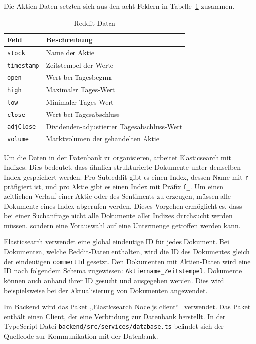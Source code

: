 \documentclass[a4paper, 10pt, conference]{IEEEtran}
\begin{document}
Die Aktien-Daten setzten sich aus den acht Feldern in Tabelle~\ref{tab:stock} zusammen.

\begin{table}[h!]
\begin{center}
\caption{Reddit-Daten}
\label{tab:stock}
\begin{tabular}{|l|l|}
\textbf{Feld} & \textbf{Beschreibung}\\
\hline
\texttt{stock}		& Name der Aktie\\
\texttt{timestamp}	& Zeitstempel der Werte\\
\texttt{open}		& Wert bei Tagesbeginn\\
\texttt{high}		& Maximaler Tages-Wert\\
\texttt{low}		& Minimaler Tages-Wert\\
\texttt{close}		& Wert bei Tagesabschluss\\
\texttt{adjClose}	& Dividenden-adjustierter Tagesabschluss-Wert\\
\texttt{volume}		& Marktvolumen der gehandelten Aktie\\
\end{tabular}
\end{center}
\end{table}

Um die Daten in der Datenbank zu organisieren, arbeitet Elasticsearch mit Indizes. Dies bedeutet, dass ähnlich strukturierte  Dokumente unter demselben Index gespeichert werden. Pro Subreddit gibt es einen Index, dessen Name mit \texttt{r\_} präfigiert ist, und pro Aktie gibt es einen Index mit Präfix \texttt{f\_}. Um einen zeitlichen Verlauf einer Aktie oder des Sentiments zu erzeugen, müssen alle Dokumente eines Index abgerufen werden. Dieses Vorgehen ermöglicht es, dass bei einer Suchanfrage nicht alle Dokumente aller Indizes durchsucht werden müssen, sondern eine Vorauswahl auf eine Untermenge getroffen werden kann.

Elasticsearch verwendet eine global eindeutige ID für jedes Dokument. Bei Dokumenten, welche Reddit-Daten enthalten, wird die ID des Dokumentes gleich der eindeutigen \texttt{commentId} gesetzt. Den Dokumenten mit Aktien-Daten wird eine ID nach folgendem Schema zugewiesen: \texttt{Aktienname\_Zeitstempel}. Dokumente können auch anhand ihrer ID gesucht und ausgegeben werden. Dies wird beispielsweise bei der Aktualisierung von Dokumenten angewendet.

Im Backend wird das Paket „Elasticsearch Node.js client“~\cite{elasticnode} verwendet. Das Paket enthält einen Client, der eine Verbindung zur Datenbank herstellt. In der TypeScript-Datei \texttt{backend/src/services/database.ts} befindet sich der Quellcode zur Kommunikation mit der Datenbank.
\end{document}
